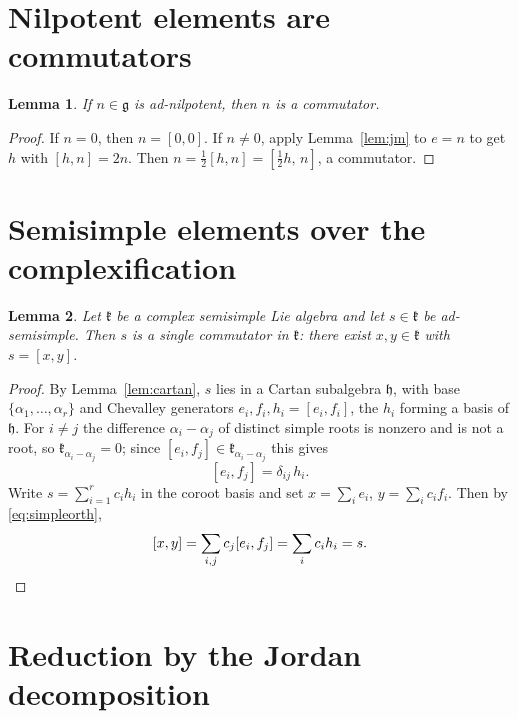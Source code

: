 \documentclass{amsart}
\newtheorem{lemma}{Lemma}
\theoremstyle{definition}
\begin{document}
\section{Nilpotent elements are commutators}

\begin{lemma}\label{lem:nilp}
If $n\in\mathfrak g$ is ad-nilpotent, then $n$ is a commutator.
\end{lemma}

\begin{proof}
If $n=0$, then $n=[0,0]$. If $n\neq0$, apply Lemma~\ref{lem:jm} to $e=n$ to get
$h$ with $[h,n]=2n$. Then $n=\tfrac12[h,n]=[\tfrac12 h,\,n]$, a commutator.
\end{proof}

\section{Semisimple elements over the complexification}

\begin{lemma}\label{lem:ssC}
Let $\mathfrak k$ be a complex semisimple Lie algebra and let $s\in\mathfrak k$ be
ad-semisimple. Then $s$ is a single commutator in $\mathfrak k$: there exist
$x,y\in\mathfrak k$ with $s=[x,y]$.
\end{lemma}

\begin{proof}
By Lemma~\ref{lem:cartan}, $s$ lies in a Cartan subalgebra $\mathfrak h$, with
base $\{\alpha_1,\dots,\alpha_r\}$ and Chevalley generators
$e_i,f_i,h_i=[e_i,f_i]$, the $h_i$ forming a basis of $\mathfrak h$. For
$i\neq j$ the difference $\alpha_i-\alpha_j$ of distinct simple roots is nonzero
and is not a root, so $\mathfrak k_{\alpha_i-\alpha_j}=0$; since
$[e_i,f_j]\in\mathfrak k_{\alpha_i-\alpha_j}$ this gives
\begin{equation}\label{eq:simpleorth}
  [e_i,f_j]=\delta_{ij}\,h_i .
\end{equation}
Write $s=\sum_{i=1}^{r}c_i h_i$ in the coroot basis and set
$x=\sum_{i}e_i$, $y=\sum_{i}c_i f_i$. Then by \eqref{eq:simpleorth},
\[
  [x,y]=\sum_{i,j}c_j[e_i,f_j]=\sum_i c_i h_i = s. \qedhere
\]
\end{proof}

\section{Reduction by the Jordan decomposition}
\end{document}
